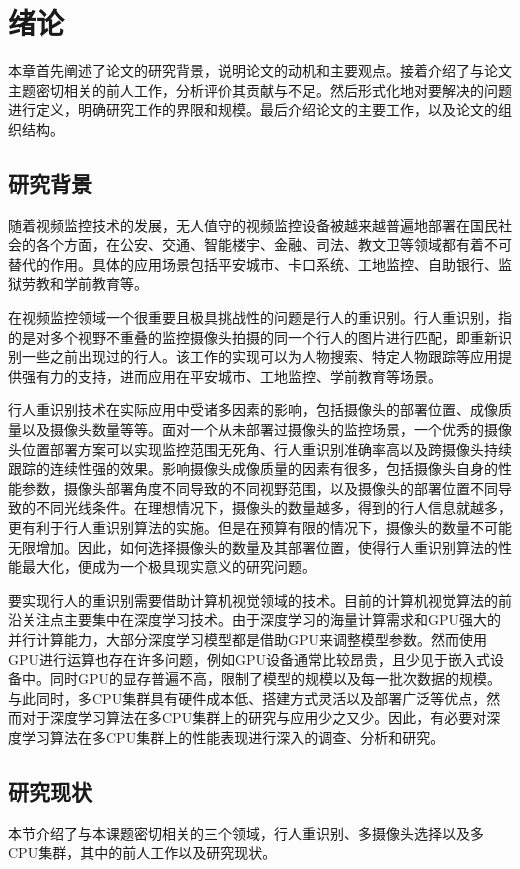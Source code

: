 \chapter{绪论}
本章首先阐述了论文的研究背景，说明论文的动机和主要观点。接着介绍了与论文主题密切相关的前人工作，分析评价其贡献与不足。然后形式化地对要解决的问题进行定义，明确研究工作的界限和规模。最后介绍论文的主要工作，以及论文的组织结构。

\section{研究背景}

随着视频监控技术的发展，无人值守的视频监控设备被越来越普遍地部署在国民社会的各个方面，在公安、交通、智能楼宇、金融、司法、教文卫等领域都有着不可替代的作用。具体的应用场景包括平安城市、卡口系统、工地监控、自助银行、监狱劳教和学前教育等。

在视频监控领域一个很重要且极具挑战性的问题是行人的重识别。行人重识别，指的是对多个视野不重叠的监控摄像头拍摄的同一个行人的图片进行匹配\cite{chen2018person}，即重新识别一些之前出现过的行人。该工作的实现可以为人物搜索、特定人物跟踪等应用提供强有力的支持，进而应用在平安城市、工地监控、学前教育等场景。

行人重识别技术在实际应用中受诸多因素的影响，包括摄像头的部署位置、成像质量以及摄像头数量等等。面对一个从未部署过摄像头的监控场景，一个优秀的摄像头位置部署方案可以实现监控范围无死角、行人重识别准确率高以及跨摄像头持续跟踪的连续性强的效果。影响摄像头成像质量的因素有很多，包括摄像头自身的性能参数，摄像头部署角度不同导致的不同视野范围，以及摄像头的部署位置不同导致的不同光线条件。在理想情况下，摄像头的数量越多，得到的行人信息就越多，更有利于行人重识别算法的实施。但是在预算有限的情况下，摄像头的数量不可能无限增加。因此，如何选择摄像头的数量及其部署位置，使得行人重识别算法的性能最大化，便成为一个极具现实意义的研究问题。

要实现行人的重识别需要借助计算机视觉领域的技术。目前的计算机视觉算法的前沿关注点主要集中在深度学习技术。由于深度学习的海量计算需求和GPU强大的并行计算能力，大部分深度学习模型都是借助GPU来调整模型参数。然而使用GPU进行运算也存在许多问题，例如GPU设备通常比较昂贵，且少见于嵌入式设备中。同时GPU的显存普遍不高，限制了模型的规模以及每一批次数据的规模。与此同时，多CPU集群具有硬件成本低、搭建方式灵活以及部署广泛等优点，然而对于深度学习算法在多CPU集群上的研究与应用少之又少。因此，有必要对深度学习算法在多CPU集群上的性能表现进行深入的调查、分析和研究。

\section{研究现状}
本节介绍了与本课题密切相关的三个领域，行人重识别、多摄像头选择以及多CPU集群，其中的前人工作以及研究现状。


